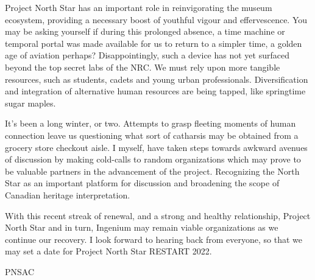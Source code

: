 Project North Star has an important role in reinvigorating the museum ecosystem, providing a necessary boost of youthful vigour and effervescence. You may be asking yourself if during this prolonged absence, a time machine or temporal portal was made available for us to return to a simpler time, a golden age of aviation perhaps? Disappointingly, such a device has not yet surfaced beyond the top secret labs of the NRC. We must rely upon more tangible resources, such as students, cadets and young urban professionals. Diversification and integration of alternative human resources are being tapped, like springtime sugar maples.

It's been a long winter, or two. Attempts to grasp fleeting moments of human connection leave us questioning what sort of catharsis may be obtained from a grocery store checkout aisle. I myself, have taken steps towards awkward avenues of discussion by making cold-calls to random organizations which may prove to be valuable partners in the advancement of the project. Recognizing the North Star as an important platform for discussion and broadening the scope of Canadian heritage interpretation. 

With this recent streak of renewal, and a strong and healthy relationship, Project North Star and in turn, Ingenium may remain viable organizations as we continue our recovery. I look forward to hearing back from everyone, so that we may set a date for Project North Star RESTART 2022.


\begin{footnotesize}
  \raggedleft PNSAC\\
\end{footnotesize}



